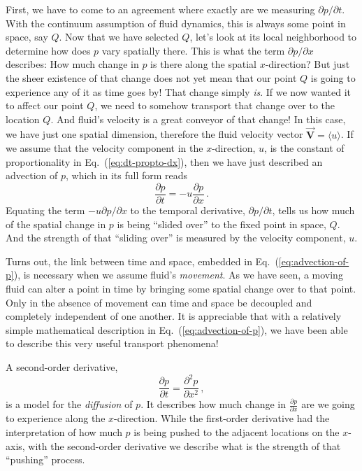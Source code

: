 First, we have to come to an agreement where exactly are we measuring $\partial p / \partial t$. With the continuum assumption of fluid dynamics, this is always some point in space, say $Q$. Now that we have selected $Q$, let's look at its local neighborhood to determine how does $p$ vary spatially there. This is what the term $\partial p / \partial x$ describes: How much change in $p$ is there along the spatial $x$-direction? But just the sheer existence of that change does not yet mean that our point $Q$ is going to experience any of it as time goes by! That change simply \textit{is}. If we now wanted it to affect our point $Q$, we need to somehow transport that change over to the location $Q$. And fluid's velocity is a great conveyor of that change! In this case, we have just one spatial dimension, therefore the fluid velocity vector $\vec{\bm{V}} = \langle u \rangle$. If we assume that the velocity component in the $x$-direction, $u$, is the constant of proportionality in Eq.~(\ref{eq:dt-propto-dx}), then we have just described an advection of $p$, which in its full form reads
\begin{equation}\label{eq:advection-of-p}
\frac{\partial p}{\partial t} = - u \frac{\partial p}{\partial x} \, .
\end{equation}
Equating the term $- u \partial p / \partial x$ to the temporal derivative, $\partial p / \partial t$, tells us how much of the spatial change in $p$ is being ``slided over'' to the fixed point in space, $Q$. And the strength of that ``sliding over'' is measured by the velocity component, $u$.

Turns out, the link between time and space, embedded in Eq.~(\ref{eq:advection-of-p}), is necessary when we assume fluid's \textit{movement}. 
As we have seen, a moving fluid can alter a point in time by bringing some spatial change over to that point. Only in the absence of movement can time and space be decoupled and completely independent of one another. It is appreciable that with a relatively simple mathematical description in Eq.~(\ref{eq:advection-of-p}), we have been able to describe this very useful transport phenomena!

A second-order derivative,
\begin{equation*}\label{eq:change-partial-2nd}
\frac{\partial p}{\partial t} = \frac{\partial^2 p}{\partial x^2} \, ,
\end{equation*}
is a model for the \textit{diffusion} of $p$. It describes how much change in $\frac{\partial p}{\partial x}$ are we going to experience along the $x$-direction. While the first-order derivative had the interpretation of how much $p$ is being pushed to the adjacent locations on the $x$-axis, with the second-order derivative we describe what is the strength of that ``pushing'' process.



